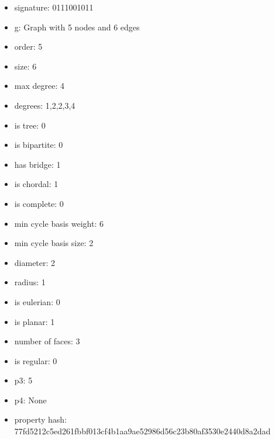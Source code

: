 \begin{itemize}
\item signature: 0111001011
\item g: Graph with 5 nodes and 6 edges
\item order: 5
\item size: 6
\item max degree: 4
\item degrees: 1,2,2,3,4
\item is tree: 0
\item is bipartite: 0
\item has bridge: 1
\item is chordal: 1
\item is complete: 0
\item min cycle basis weight: 6
\item min cycle basis size: 2
\item diameter: 2
\item radius: 1
\item is eulerian: 0
\item is planar: 1
\item number of faces: 3
\item is regular: 0
\item p3: 5
\item p4: None
\item property hash: 77fd5212c5ed261fbbf013cf4b1aa9ae52986d56c23b80af3530e2440d8a2dad
\end{itemize}
\newpage
\begin{figure}
\end{figure}
